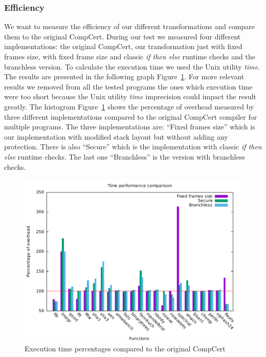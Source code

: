 \documentclass[11pt]{sdm}
\begin{document}
\subsubsection{Efficiency}
\label{ssub:Efficiency}

We want to measure the efficiency of our different transformations and compare them to the original CompCert. During our test we measured four different implementations: the original CompCert, our transformation just with fixed frames size, with fixed frame size and classic \textit{if then else} runtime checks and the branchless version.
To calculate the execution time we used the Unix utility \textit{time}.
The results are presented in the following graph Figure~\ref{time_percentage_graph}.
For more relevant results we removed from all the tested programs the ones which execution time were too short because the Unix utility \textit{time} imprecision could impact the result greatly.
The histogram Figure~\ref{time_percentage_graph} shows the percentage of overhead measured by three different implementations compared to the original CompCert compiler for multiple programs.
The three implementations are: ``Fixed frames size'' which is our implementation with modified stack layout but without adding any protection. There is also ``Secure'' which is the implementation with classic \textit{if then else} runtime checks. The last one ``Branchless'' is the version with branchless checks.

\begin{figure}[!ht]
\centering
\includegraphics[width=1\textwidth]{images/time_percentage_graph.pdf}
\caption{Execution time percentages compared to the original CompCert}
\label{time_percentage_graph}
\end{figure}
\end{document}
